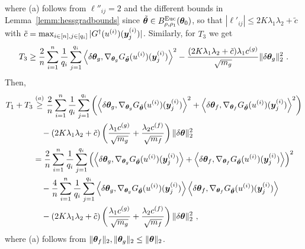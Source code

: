 where (a) follows from $\ell''_{ij}=2$ and the different bounds in Lemma~\ref{lemm:hessgradbounds} since $\tilde{{\bm{\theta}}}\in B^{\mathrm{Euc}}_{\rho,\rho_1}({\bm{\theta}}_0)$, so that $|\ell'_{ij}|\leq 2K\lambda_1\lambda_2+\tilde{c}$  with $\tilde{c}=\max_{i\in[n],j\in[q_i]}|G^\dagger(u^{(i)})({\bm{y}}^{(i)}_j)|$.
Similarly, for $T_3$ we get
\begin{align*}
    T_3 \geq \frac{2}{n} \sum_{i=1}^n \frac{1}{q_i} \sum_{j=1}^{q_i}  \left\langle \delta {\bm{\theta}}_g , \nabla_{{\bm{\theta}}_g} G_{\tilde{{\bm{\theta}}}}(u^{(i)})({\bm{y}}^{(i)}_j)  \right\rangle^2 - \frac{(2K\lambda_1\lambda_2+\tilde{c})\lambda_1 c^{(g)}}{\sqrt{m_g}} \| \delta {\bm{\theta}}_g \|_2^2~.
\end{align*}
Then, 
\begin{align*}
T_1+T_3 &\overset{(a)}{\geq} \frac{2}{n} \sum_{i=1}^n \frac{1}{q_i} \sum_{j=1}^{q_i}  \left(\left\langle \delta \vtheta_g ,  \nabla_{\vtheta_g} G_{\tilde{\vtheta}}(u^{(i)})(\vy^{(i)}_j) \right\rangle^2
+
\left\langle \delta \vtheta_f ,  \nabla_{\vtheta_f} G_{\tilde{\vtheta}}(u^{(i)})(\vy^{(i)}_j) \right\rangle^2
\right)\\
&\quad- 
    (2K\lambda_1\lambda_2+\tilde{c})
    \left(\frac{\lambda_1 c^{(g)}}{\sqrt{m_g}} + \frac{\lambda_2 c^{(f)}}{\sqrt{m_f}}\right) \| \delta \vtheta \|_2^2\\
%
&= \frac{2}{n} \sum_{i=1}^n \frac{1}{q_i} \sum_{j=1}^{q_i}  \left(\left\langle \delta \vtheta_g ,  \nabla_{\vtheta_g} G_{\tilde{\vtheta}}(u^{(i)})(\vy^{(i)}_j) \right\rangle
+
\left\langle \delta \vtheta_f ,  \nabla_{\vtheta_f} G_{\tilde{\vtheta}}(u^{(i)})(\vy^{(i)}_j) \right\rangle
\right)^2\\
&\quad -\frac{4}{n} \sum_{i=1}^n \frac{1}{q_i} \sum_{j=1}^{q_i}  \left\langle \delta \vtheta_g ,  \nabla_{\vtheta_g} G_{\tilde{\vtheta}}(u^{(i)})(\vy^{(i)}_j) \right\rangle
\left\langle \delta \vtheta_f ,  \nabla_{\vtheta_f} G_{\tilde{\vtheta}}(u^{(i)})(\vy^{(i)}_j) \right\rangle\\
&\quad- 
    (2K\lambda_1\lambda_2+\tilde{c})
    \left(\frac{\lambda_1 c^{(g)}}{\sqrt{m_g}} + \frac{\lambda_2 c^{(f)}}{\sqrt{m_f}}\right) \| \delta \vtheta \|_2^2~,
\end{align*}
where (a) follows from $\lVert{\bm{\theta}}_f\rVert_2,\lVert{\bm{\theta}}_g\rVert_2\leq\lVert{\bm{\theta}}\rVert_2$.


